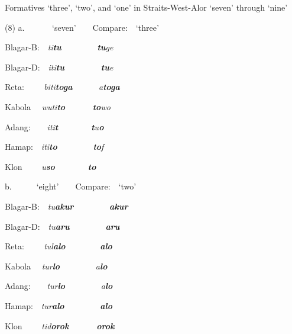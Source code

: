Formatives {\textquoteleft}three{\textquoteright}, {\textquoteleft}two{\textquoteright}, and {\textquoteleft}one{\textquoteright} in Straits-West-Alor {\textquoteleft}seven{\textquoteright} through {\textquoteleft}nine{\textquoteright} 

(8) a. \ \ \ \ \ \ {\textquoteleft}seven{\textquoteright}\ \ \ \  Compare:\ \ {\textquoteleft}three{\textquoteright}

Blagar-B:\ \ \textit{ti}\textbf{\textit{tu}}\textit{ } \ \ \ \ \ \ \ \ \textbf{\textit{tu}}\textit{ge}

Blagar-D:\ \ \textit{{\texthtb}}\textit{iti}\textbf{\textit{tu}}\textit{ \ \ \ \ \ \ \ \ }\textbf{\textit{tu}}\textit{e} \ \ \ \ \ \ \ \  

Reta:\textit{ \ \ \ \ }\textit{biti}\textbf{\textit{toga}}\textbf{\textit{\ \ }}\ \ \ \ \textit{a}\textbf{\textit{toga}} 

Kabola \ \ \textit{wuti}\textbf{\textit{to}}\textit{ } \ \ \ \ \ \ \textbf{\textit{to}}\textit{wo}\textbf{ \ \ }

Adang:\ \ \ \ \textit{iti}\textbf{\textit{t}}\textit{{\textopeno}}\ \  \ \ \ \ \ \ \textbf{\textit{t}}\textit{u}\textbf{\textit{o}}

Hamap:\ \ \textit{iti}\textbf{\textit{to}}\textit{ } \ \  \ \ \ \ \ \ \textbf{\textit{to}}\textit{f}

Klon \ \ \ \ \textit{u}\textbf{\textit{so{\ng}}}\ \ \ \ \ \ \ \ \textbf{\textit{to{\ng}}}\textbf{ }

b.\ \ \ \ \ \ {\textquoteleft}eight{\textquoteright}\ \ \ \ Compare:\ \ {\textquoteleft}two{\textquoteright}

Blagar-B:\ \ \textit{tu}\textbf{\textit{akur}} \ \ \ \ \ \ \ \ \textbf{\textit{akur}}

Blagar-D:\ \ \textit{tu}\textbf{\textit{aru}} \ \ \ \ \ \ \ \ \textbf{\textit{aru}} 

Reta:\textit{ \ \ \ \ tul}\textbf{\textit{alo\ \ }}\ \ \ \ \ \ \textbf{\textit{alo}} 

Kabola \ \ \textit{tur}\textbf{\textit{lo}} \ \  \ \ \ \ \ \ \textit{a}\textbf{\textit{lo}}\textbf{ \ \ }

Adang:\ \ \ \ \textit{tur}\textbf{\textit{lo}} \ \  \ \ \ \ \ \ \textit{a}\textbf{\textit{lo}}

Hamap:\ \ \textit{tur}\textbf{\textit{alo}} \ \  \ \ \ \ \ \ \textbf{\textit{alo}}

Klon \ \ \ \ \textit{tid}\textbf{\textit{orok}} \ \ \ \ \ \ \textbf{\textit{orok}}\textbf{ }

